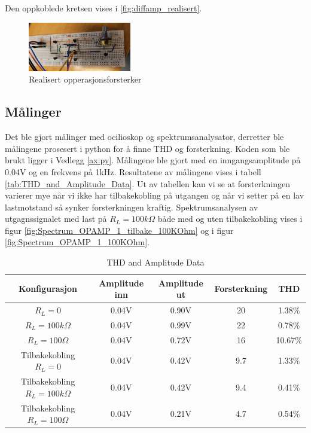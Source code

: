 Den oppkoblede kretsen vises i \autoref{fig:diffamp_realisert}.

\begin{figure}[!h]
    \centering
    \includegraphics[width=0.4\textwidth, angle=90]{Bilder/feilBilde.jpg}
    \caption{Realisert opperasjonsforsterker}
    \label{fig:diffamp_realisert}
\end{figure}

\clearpage
\subsection{Målinger}
Det ble gjort målinger med ocilioskop og spektrumsanalysator, derretter ble målingene prosesert i python for å finne THD og forsterkning. Koden som ble brukt ligger i Vedlegg \ref{ax:py}. Målingene ble gjort med en inngangsamplitude på 0.04V og en frekvens på 1kHz. Resultatene av målingene vises i tabell \autoref{tab:THD_and_Amplitude_Data}. Ut av tabellen kan vi se at forsterkningen varierer mye når vi ikke har tilbakekobling på utgangen og når vi setter på en lav lastmotstand så synker forsterkningen kraftig. Spektrumsanalysen av utgagnssignalet med last på $R_L = 100k\Omega$ både med og uten tilbakekobling vises i figur \autoref{fig:Spectrum_OPAMP_1_tilbake_100KOhm} og i figur \autoref{fig:Spectrum_OPAMP_1_100KOhm}. 

\begin{table}[h!]
    \centering
    \begin{tabular}{ |c|c|c|c|c| }
        \hline
        Konfigurasjon & Amplitude inn & Amplitude ut & Forsterkning &THD\\
        \hline
        $R_L = 0$ & 0.04V & 0.90V & 20 &1.38\% \\
        $R_L = 100k\Omega$ & 0.04V & 0.99V & 22& 0.78\% \\
        $R_L = 100\Omega$ & 0.04V & 0.72V & 16& 10.67\% \\
        \hline
        Tilbakekobling $R_L =0$& 0.04V & 0.42V & 9.7& 1.33\% \\
        Tilbakekobling $R_L =100k\Omega$ & 0.04V & 0.42V & 9.4& 0.41\% \\
        Tilbakekobling $R_L =100\Omega$ & 0.04V & 0.21V & 4.7& 0.54\% \\
        \hline
    \end{tabular}
    \caption{THD and Amplitude Data}
    \label{tab:THD_and_Amplitude_Data}
  \end{table}

